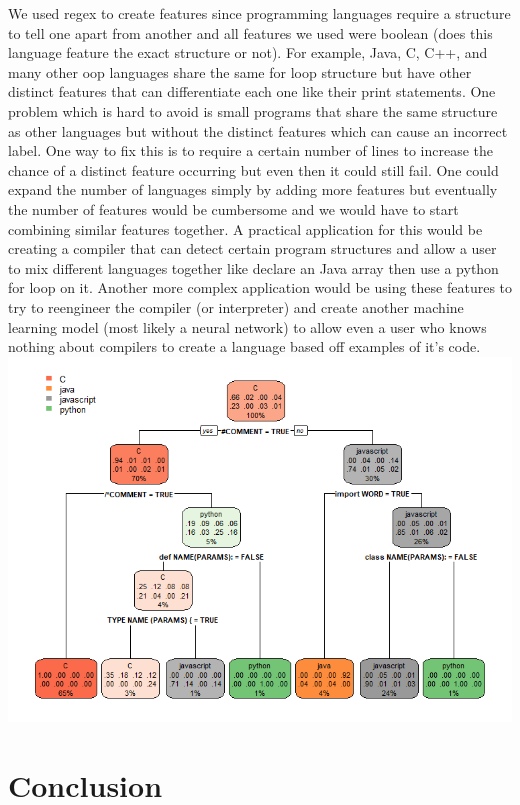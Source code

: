 \documentclass[11pt]{article}
\makeatletter
\def\maxwidth{\ifdim\Gin@nat@width>\linewidth\linewidth
    \else\Gin@nat@width\fi}
\let\Oldincludegraphics\includegraphics
\renewcommand{\includegraphics}[1]{\Oldincludegraphics[width=.8\maxwidth]{#1}}
\makeatother
\begin{document}
We used regex to create features since programming languages require a
structure to tell one apart from another and all features we used were
boolean (does this language feature the exact structure or not). For
example, Java, C, C++, and many other oop languages share the same for
loop structure but have other distinct features that can differentiate
each one like their print statements. One problem which is hard to avoid
is small programs that share the same structure as other languages but
without the distinct features which can cause an incorrect label. One
way to fix this is to require a certain number of lines to increase the
chance of a distinct feature occurring but even then it could still
fail. One could expand the number of languages simply by adding more
features but eventually the number of features would be cumbersome and
we would have to start combining similar features together. A practical
application for this would be creating a compiler that can detect
certain program structures and allow a user to mix different languages
together like declare an Java array then use a python for loop on it.
Another more complex application would be using these features to try to
reengineer the compiler (or interpreter) and create another machine
learning model (most likely a neural network) to allow even a user who
knows nothing about compilers to create a language based off examples of
it's code. \includegraphics{Rplot.png}

    \hypertarget{conclusion}{%
\section{Conclusion}\label{conclusion}}
\end{document}
